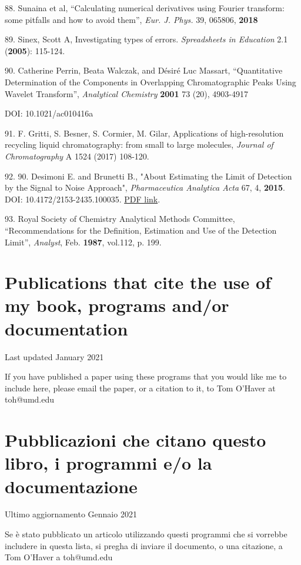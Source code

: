 88. Sunaina et al, ``Calculating numerical derivatives using Fourier transform: some pitfalls and how to avoid them'', \textit{Eur. J. Phys.} 39, 065806, \textbf{2018}

89. Sinex, Scott A, Investigating types of errors. \textit{Spreadsheets in Education} 2.1 (\textbf{2005}): 115-124.

90. Catherine Perrin, Beata Walczak, and D\'{e}sir\'{e} Luc Massart, ``Quantitative Determination of the Components in Overlapping Chromatographic Peaks Using Wavelet Transform'', \textit{Analytical Chemistry} \textbf{2001} 73 (20), 4903-4917

DOI: 10.1021/ac010416a

91. F. Gritti, S. Besner, S. Cormier, M. Gilar, Applications of high-resolution recycling liquid chromatography: from small to large molecules, \textit{Journal of Chromatography} A 1524 (2017) 108-120.

92. 90. Desimoni E. and Brunetti B., "About Estimating the Limit of Detection by the Signal to Noise Approach", \textit{Pharmaceutica Analytica Acta} 67, 4, \textbf{2015}. DOI: 10.4172/2153-2435.100035. \href{https://www.longdom.org/open-access/about-estimating-the-limit-of-detection-by-the-signal-to-noise-approach-2153-2435-1000355.pdf}{PDF link}.

93. Royal Society of Chemistry Analytical Methods Committee, ``Recommendations for the Definition, Estimation and Use of the Detection Limit'', \textit{Analyst}, Feb. \textbf{1987}, vol.112, p. 199.


\ifLangEnglish
	\chapter{Publications that cite the use of my book, programs and/or documentation\label{ref-0538}}

	Last updated January 2021

	If you have published a paper using these programs that you would like me to include here, please email the paper, or a citation to it, to Tom O'Haver at toh@umd.edu
\else
	\chapter{Pubblicazioni che citano questo libro, i programmi e/o la documentazione\label{ref-0537}}

	Ultimo aggiornamento Gennaio 2021

	Se \`{e} stato pubblicato un articolo utilizzando questi programmi che si vorrebbe includere in questa lista, si pregha di inviare il documento, o una citazione, a Tom O'Haver a toh@umd.edu
\fi


